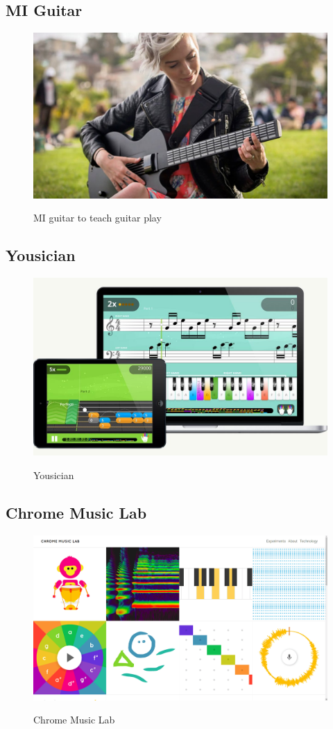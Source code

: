 	\subsection{MI Guitar}
		\begin{figure}[H]
			\centering
			\includegraphics[width=0.8\linewidth]{figure/Analysis/miguitar}
			\label{fig:miguitar}
			\caption{MI guitar to teach guitar play}
		\end{figure}
	
	\subsection{Yousician}
		\begin{figure}[H]
			\centering
			\includegraphics[width=0.8\linewidth]{figure/Analysis/yousician.jpg}
			\label{fig:yousician}
			\caption{Yousician}
		\end{figure}
	\subsection{Chrome Music Lab}
		\begin{figure}[H]
			\centering
			\includegraphics[width=0.8\linewidth]{figure/Analysis/chromeMusicLab.png}
			\label{fig:chromeMusicLab}
			\caption{Chrome Music Lab}
		\end{figure}

		